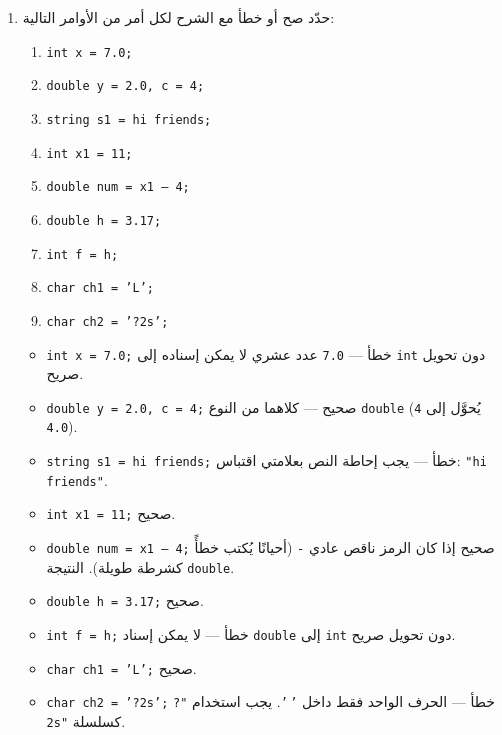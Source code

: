 \documentclass[12pt]{article}
\begin{document}
\begin{enumerate}[itemsep=2em]
\item
	حدّد صح أو خطأ مع الشرح لكل أمر من الأوامر التالية:
\begin{english}
    \begin{enumerate}
	\item \texttt{int x = 7.0;}     \underline{\hspace{7cm}}
	\item \texttt{double y = 2.0, c = 4;}   \underline{\hspace{7cm}}
	\item \texttt{string s1 = hi friends;}  \underline{\hspace{7cm}}
	\item \texttt{int x1 = 11;}  \underline{\hspace{7cm}}
    \item \texttt{double num = x1 – 4;}   \underline{\hspace{7cm}}
	\item \texttt{double h = 3.17;}  \underline{\hspace{7cm}}
    \item \texttt{int f = h;}  \underline{\hspace{7cm}}
	\item \texttt{char ch1 = 'L';}  \underline{\hspace{7cm}}
	\item \texttt{char ch2 = '?2s';}   \underline{\hspace{7cm}}

\end{enumerate}
\end{english}

\ifwithsols
\begin{boxSolution}
\begin{itemize}
  \item \texttt{int x = 7.0;} خطأ — \texttt{7.0} عدد عشري لا يمكن إسناده إلى \texttt{int} دون تحويل صريح.
  \item \texttt{double y = 2.0, c = 4;} صحيح — كلاهما من النوع \texttt{double} (\texttt{4} يُحوَّل إلى \texttt{4.0}).
  \item \texttt{string s1 = hi friends;} خطأ — يجب إحاطة النص بعلامتي اقتباس: \texttt{"hi friends"}.
  \item \texttt{int x1 = 11;} صحيح.
  \item \texttt{double num = x1 – 4;} صحيح إذا كان الرمز ناقص عادي \texttt{-} (أحيانًا يُكتب خطأً كشرطة طويلة). النتيجة \texttt{double}.
  \item \texttt{double h = 3.17;} صحيح.
  \item \texttt{int f = h;} خطأ — لا يمكن إسناد \texttt{double} إلى \texttt{int} دون تحويل صريح.
  \item \texttt{char ch1 = 'L';} صحيح.
  \item \texttt{char ch2 = '?2s';} خطأ — الحرف الواحد فقط داخل \texttt{'}\,\texttt{'}. يجب استخدام \texttt{"?2s"} كسلسلة.
\end{itemize}
\end{boxSolution}
\fi


\end{enumerate}
\end{document}
